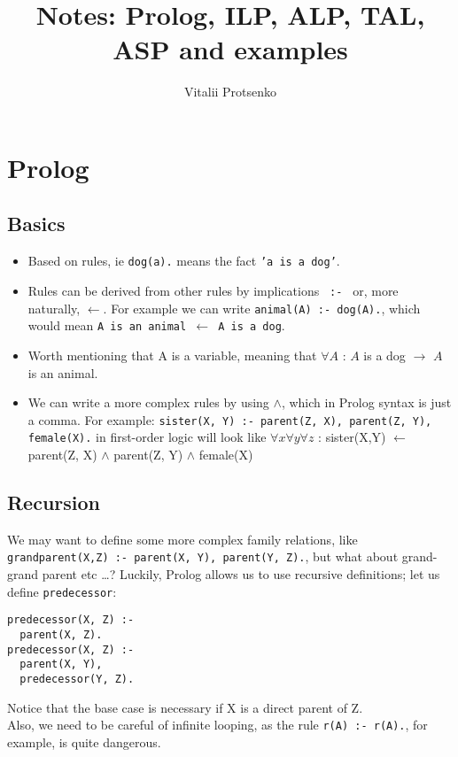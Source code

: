 \documentclass[11pt]{article}
\begin{document}
\title{Notes: Prolog, ILP, ALP, TAL, ASP and examples}

\author{Vitalii Protsenko}

\date{}

\maketitle

\section{Prolog}

\subsection{Basics}

\begin{itemize}
  \item Based on rules, ie \texttt{dog(a).} means the fact \texttt{'a is a dog'}.
  \item Rules can be derived from other rules by implications \texttt{ :- } or, more naturally,  $\leftarrow$. For example we can write \texttt{animal(A) :- dog(A).}, which would mean \texttt{A is an animal $\leftarrow$ A is a dog}.
  \item Worth mentioning that A is a variable, meaning that $\forall A$ : $A$ is a dog $\rightarrow$ $A$ is an animal.
  \item We can write a more complex rules by using $\wedge$, which in Prolog syntax is just a comma. For example: \texttt{sister(X, Y) :- parent(Z, X), parent(Z, Y), female(X).} in first-order logic will look like $\forall x \forall y \forall z$ : sister(X,Y) $\leftarrow$ parent(Z, X) $\wedge$ parent(Z, Y) $\wedge$ female(X)
\end{itemize}

\subsection{Recursion}
We may want to define some more complex family relations, like \texttt{grandparent(X,Z) :- parent(X, Y), parent(Y, Z).}, but what about grand-grand parent etc \ldots ? Luckily, Prolog allows us to use recursive definitions; let us define \texttt{predecessor}:
\begin{lstlisting}
predecessor(X, Z) :-
  parent(X, Z).
predecessor(X, Z) :-
  parent(X, Y),
  predecessor(Y, Z).
\end{lstlisting}
Notice that the base case is necessary if X is a direct parent of Z.\\Also, we need to be careful of infinite looping, as the rule \texttt{r(A) :- r(A).}, for example, is quite dangerous.
\end{document}
